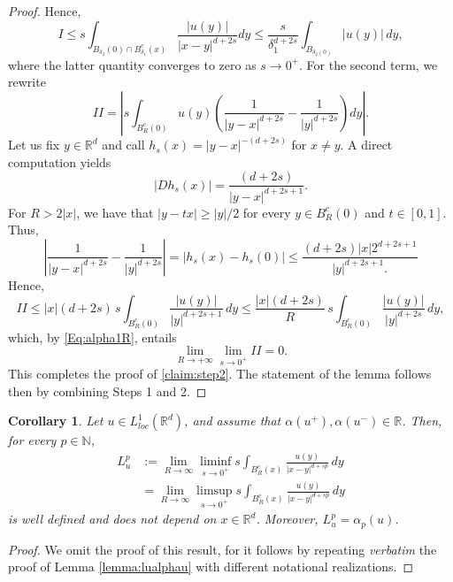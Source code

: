 \documentclass[reqno,11pt]{amsart}
\numberwithin{equation}{section}
\theoremstyle{definition} %
\theoremstyle{plain}
\newtheorem{cor}[cor]{Corollary}
\theoremstyle{definition}
\theoremstyle{remark}
\def\N{\mathbb{N}}
\def\R{\mathbb{R}}
\newcommand{\abs}[1]{\left|#1\right|}
\begin{document}
\begin{proof}
    Hence,
    \begin{equation*}
       I\leq s\int_{B_{\delta_2}(0)\cap B_{\delta_1}^c(x)}\frac{\abs{u(y)}}{\abs{x-y}^{d+2s}}dy \leq \frac{s}{\delta_1^{d+2s}}\int_{B_{\delta_2(0)}}\abs{u(y)}\,dy,
    \end{equation*}
    where the latter quantity converges to zero as $s\to 0^+$.
    For the second term, we rewrite
    \begin{equation*}
        II=\left|s\int_{B_R^c(0)}u(y)\left(\frac{1}{\abs{y-x}^{d+2s}}-\frac{1}{\abs{y}^{d+2s}}\right)dy\right|.
    \end{equation*}
    Let us fix $y\in \R^d$ and call $h_s(x)=\abs{y-x}^{-(d+2s)}$ for $x\neq y$. A direct computation yields
    \begin{equation*}
        \abs{Dh_s(x)}=\frac{(d+2s)}{\abs{y-x}^{d+2s+1}}.
    \end{equation*}
    For $R>2|x|$, we have that $\abs{y-tx}\geq\abs{y}/2$ for every $y\in B_R^c(0)$ and $t\in [0,1]$. Thus,
    \begin{equation*}
        \abs{\frac{1}{\abs{y-x}^{d+2s}}-\frac{1}{\abs{y}^{d+2s}}}=\abs{h_s(x)-h_s(0)}\leq \frac{(d+2s)\abs{x}2^{d+2s+1}}{\abs{y}^{d+2s+1}.}
    \end{equation*}
    Hence,
    \begin{equation}
    \label{eq:estimateII}
        II\leq \abs{x}(d+2s)\,s\int_{B^c_R(0)}\frac{|u(y)|}{\abs{y}^{d+2s+1}}\,dy\leq \frac{\abs{x}(d+2s)}{R}\,s\int_{B_R^c(0)}\frac{|u(y)|}{\abs{y}^{d+2s}}\,dy,
    \end{equation}
    which, by \eqref{Eq:alpha1R}, entails
    \begin{equation*}
        \lim_{R\to+\infty}\lim_{s\to 0^+}II=0.
    \end{equation*}
    This completes the proof of \eqref{claim:step2}. The statement of the lemma follows then by combining Steps 1 and 2.
\end{proof}

\begin{cor}
\label{lemma:lu-positive}
Let $u\in L^1_{loc}(\R^d)$, and assume that $\alpha(u^+),\alpha(u^-)\in \R$. Then, for every $p\in \N$, 
    \begin{equation}
        \label{luwelldefined-p}
        \begin{split}
             L_u^p&:=\lim_{R\to\infty}\liminf_{s\to 0^+}s\int_{B_R^c(x)}\frac{u(y)}{\abs{x-y}^{d+sp}}\,dy\\
             &=\lim_{R\to\infty}\limsup_{s\to 0^+}s\int_{B_R^c(x)}\frac{u(y)}{\abs{x-y}^{d+sp}}\,dy
        \end{split}
    \end{equation}
    is well defined and does not depend on $x\in\R^d$. Moreover, $L_u^p=\alpha_p(u)$.
\end{cor}
\begin{proof}
We omit the proof of this result, for it follows by repeating \emph{verbatim} the proof of Lemma \ref{lemma:lualphau} with different notational realizations.
\end{proof}
\end{document}
